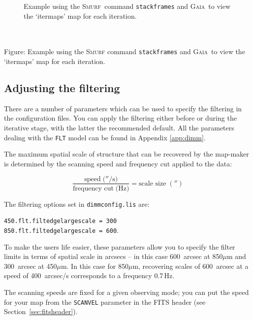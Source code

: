 \documentclass[twoside,11pt]{article}
\newcommand{\htmladdimg}[1]{}
\newenvironment{latexonly}{}{}
\newcommand{\xref}[3]{#1}
\newcommand{\xlabel}[1]{}
\renewcommand{\_}{\texttt{\symbol{95}}}
\newenvironment{fmpage}[1]{\begin{lrbox}{\fmbox}\begin{minipage}{#1}}{\end{minipage}\end{lrbox}\fbox{\usebox{\fmbox}}}
\newcommand{\gaia}{\xref{\textsc{Gaia}}{sun214}{}}
\newcommand{\smurf}{\xref{\textsc{Smurf}}{sun258}{}}
\begin{document}
\begin{latexonly}
\begin{figure}[ht!]
\begin{center}
\begin{fmpage}{0.95\linewidth}
\end{fmpage}
\end{center}
\caption{\small Example using the \smurf\ command \texttt{stackframes} and
\gaia\ to view the `itermaps' map for each iteration.}
\label{fig:stack}
\end{figure}
\end{latexonly}

\begin{htmlonly}
 \label{fig:stack} \htmladdimg{sc21_view_itermaps.png}
 \\ \\
 Figure: Example using the \textsc{Smurf} command \texttt{stackframes} and
 \gaia\ to view the `itermaps' map for each iteration.
\end{htmlonly}

\subsection{\xlabel{filter}Adjusting the filtering}
\label{sec:filt}

There are a number of parameters which can be used to specify the
filtering in the configuration files. You can apply the filtering
either before or during the iterative stage, with the latter the
recommended default. All the parameters dealing with the \texttt{FLT}
model can be found in Appendix \ref{app:dimm}.

The maximum spatial scale of structure that can be recovered by the
map-maker is determined by the scanning speed and frequency cut
applied to the data:

\begin{equation}
\frac{\mbox{speed}\;(''/\mbox{s)}}{\mbox{frequency cut}\;(\mbox{Hz)}}=\mbox{scale size}\;('')
\end{equation}

The filtering options set in \texttt{dimmconfig.lis} are:

\texttt{450.flt.filt\_edge\_largescale = 300} \\
\texttt{850.flt.filt\_edge\_largescale = 600}.

To make the users life easier, these parameters allow you to specify
the filter limits in terms of spatial scale in arcsecs -- in this case
600~arcsec at 850$\mu$m and 300~arcsec at 450$\mu$m. In this case for
850$\mu$m, recovering scales of 600~arcsec at a speed of 400~arcsec/s
corresponds to a frequency 0.7\,Hz.

The scanning speeds are fixed for a given observing mode; you can put
the speed for your map from the \texttt{SCAN\_VEL} parameter in the
FITS header (see Section~\ref{sec:fitsheader}).
\end{document}
